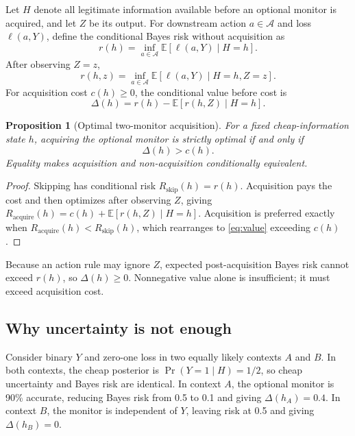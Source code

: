 \documentclass[11pt,a4paper]{article}
\newtheorem{proposition}{Proposition}
\begin{document}
Let $H$ denote all legitimate information available before an optional monitor is acquired, and let $Z$ be its output. For downstream action $a\in\mathcal{A}$ and loss $\ell(a,Y)$, define the conditional Bayes risk without acquisition as
\begin{equation}
  r(h)=\inf_{a\in\mathcal{A}}\mathbb{E}[\ell(a,Y)\mid H=h].
\end{equation}
After observing $Z=z$,
\begin{equation}
  r(h,z)=\inf_{a\in\mathcal{A}}\mathbb{E}[\ell(a,Y)\mid H=h,Z=z].
\end{equation}
For acquisition cost $c(h)\ge 0$, the conditional value before cost is
\begin{equation}
  \Delta(h)=r(h)-\mathbb{E}[r(h,Z)\mid H=h].
  \label{eq:value}
\end{equation}

\begin{proposition}[Optimal two-monitor acquisition]
For a fixed cheap-information state $h$, acquiring the optional monitor is strictly optimal if and only if
\begin{equation}
  \Delta(h)>c(h).
\end{equation}
Equality makes acquisition and non-acquisition conditionally equivalent.
\end{proposition}

\begin{proof}
Skipping has conditional risk $R_{\mathrm{skip}}(h)=r(h)$. Acquisition pays the cost and then optimizes after observing $Z$, giving
$R_{\mathrm{acquire}}(h)=c(h)+\mathbb{E}[r(h,Z)\mid H=h]$.
Acquisition is preferred exactly when $R_{\mathrm{acquire}}(h)<R_{\mathrm{skip}}(h)$, which rearranges to \cref{eq:value} exceeding $c(h)$.
\end{proof}

Because an action rule may ignore $Z$, expected post-acquisition Bayes risk cannot exceed $r(h)$, so $\Delta(h)\ge0$. Nonnegative value alone is insufficient; it must exceed acquisition cost.

\subsection{Why uncertainty is not enough}

Consider binary $Y$ and zero-one loss in two equally likely contexts $A$ and $B$. In both contexts, the cheap posterior is $\Pr(Y=1\mid H)=1/2$, so cheap uncertainty and Bayes risk are identical. In context $A$, the optional monitor is 90\% accurate, reducing Bayes risk from 0.5 to 0.1 and giving $\Delta(h_A)=0.4$. In context $B$, the monitor is independent of $Y$, leaving risk at 0.5 and giving $\Delta(h_B)=0$.
\end{document}
